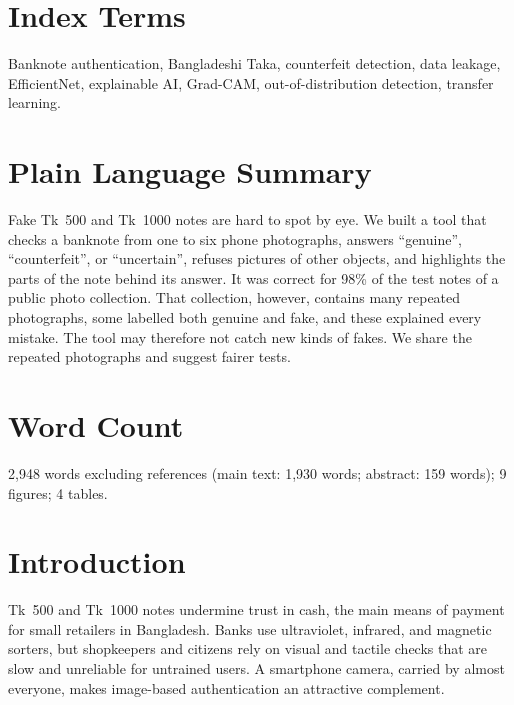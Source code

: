 \documentclass[journal,onecolumn]{IEEEtran}
\begin{document}
\section*{Index Terms}
Banknote authentication, Bangladeshi Taka, counterfeit detection, data leakage,
EfficientNet, explainable AI, Grad-CAM, out-of-distribution detection, transfer learning.

\section*{Plain Language Summary}
Fake Tk~500 and Tk~1000 notes are hard to spot by eye. We built a tool that checks a
banknote from one to six phone photographs, answers ``genuine'', ``counterfeit'', or
``uncertain'', refuses pictures of other objects, and highlights the parts of the note
behind its answer. It was correct for 98\% of the test notes of a public photo
collection. That collection, however, contains many repeated photographs, some labelled
both genuine and fake, and these explained every mistake. The tool may therefore not
catch new kinds of fakes. We share the repeated photographs and suggest fairer tests.

\section*{Word Count}
2{,}948 words excluding references (main text: 1{,}930 words; abstract: 159 words);
9 figures; 4 tables.

\section{Introduction}
\label{sec:intro}

 Tk~500 and Tk~1000 notes undermine trust in cash, the main
means of payment for small retailers in Bangladesh. Banks use ultraviolet, infrared, and
magnetic sorters, but shopkeepers and citizens rely on visual and tactile checks that are
slow and unreliable for untrained users. A smartphone camera, carried by almost
everyone, makes image-based authentication an attractive complement.
\end{document}
